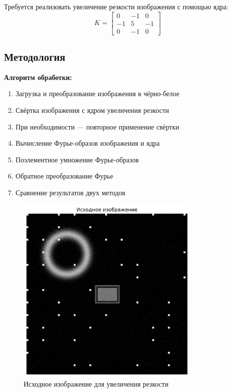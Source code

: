 Требуется реализовать увеличение резкости изображения с помощью ядра:
\begin{equation}
K = \begin{bmatrix}
0 & -1 & 0 \\
-1 & 5 & -1 \\
0 & -1 & 0
\end{bmatrix}
\end{equation}

\subsection*{Методология}

\textbf{Алгоритм обработки:}
\begin{enumerate}
    \item Загрузка и преобразование изображения в чёрно-белое
    \item Свёртка изображения с ядром увеличения резкости
    \item При необходимости — повторное применение свёртки
    \item Вычисление Фурье-образов изображения и ядра
    \item Поэлементное умножение Фурье-образов
    \item Обратное преобразование Фурье
    \item Сравнение результатов двух методов
\end{enumerate}

\begin{figure}[H]
    \centering
    \includegraphics[width=0.8\textwidth]{images/task3/original_image.png}
    \caption{Исходное изображение для увеличения резкости}
    \label{fig:original_sharp}
\end{figure}

